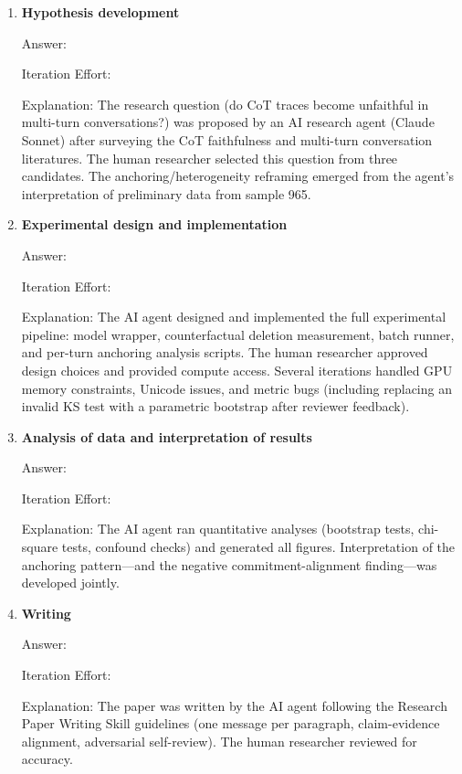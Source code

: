 \documentclass{article}
\begin{document}
\begin{enumerate}

  \item \textbf{Hypothesis development}

  Answer: \involvementD{}

  Iteration Effort: \iterationMedium{}

  Explanation: The research question (do CoT traces become
  unfaithful in multi-turn conversations?) was proposed by an AI
  research agent (Claude Sonnet) after surveying the CoT
  faithfulness and multi-turn conversation literatures.
  The human researcher selected this question from three candidates.
  The anchoring/heterogeneity reframing emerged from the agent's
  interpretation of preliminary data from sample 965.

  \item \textbf{Experimental design and implementation}

  Answer: \involvementD{}

  Iteration Effort: \iterationMedium{}

  Explanation: The AI agent designed and implemented the full
  experimental pipeline: model wrapper, counterfactual deletion
  measurement, batch runner, and per-turn anchoring analysis scripts.
  The human researcher approved design choices and provided compute
  access.
  Several iterations handled GPU memory constraints, Unicode
  issues, and metric bugs (including replacing an invalid KS test
  with a parametric bootstrap after reviewer feedback).

  \item \textbf{Analysis of data and interpretation of results}

  Answer: \involvementC{}

  Iteration Effort: \iterationLow{}

  Explanation: The AI agent ran quantitative analyses (bootstrap
  tests, chi-square tests, confound checks) and generated all
  figures.
  Interpretation of the anchoring pattern---and the negative
  commitment-alignment finding---was developed jointly.

  \item \textbf{Writing}

  Answer: \involvementD{}

  Iteration Effort: \iterationLow{}

  Explanation: The paper was written by the AI agent following the
  Research Paper Writing Skill guidelines (one message per
  paragraph, claim-evidence alignment, adversarial self-review).
  The human researcher reviewed for accuracy.

\end{enumerate}
\end{document}
